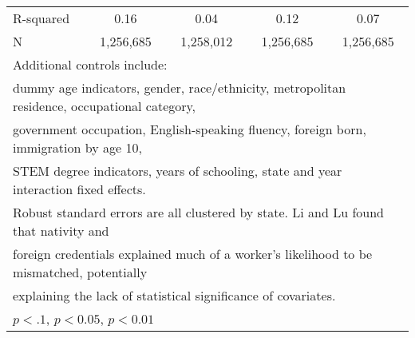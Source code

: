 \begin{table}[htbp]
\begin{tabular}{l*{4}{c}}
R-squared           &        0.16         &        0.04         &        0.12         &        0.07         \\
N                   &   1,256,685         &   1,258,012         &   1,256,685         &   1,256,685         \\
\bottomrule
\multicolumn{5}{l}{\footnotesize Additional controls include:}\\
\multicolumn{5}{l}{\footnotesize dummy age indicators, gender, race/ethnicity, metropolitan residence, occupational category,}\\
\multicolumn{5}{l}{\footnotesize government occupation, English-speaking fluency, foreign born, immigration by age 10,}\\
\multicolumn{5}{l}{\footnotesize STEM degree indicators, years of schooling, state and year interaction fixed effects.}\\
\multicolumn{5}{l}{\footnotesize Robust standard errors are all clustered by state. Li and Lu found that nativity and}\\
\multicolumn{5}{l}{\footnotesize foreign credentials explained much of a worker's likelihood to be mismatched, potentially}\\
\multicolumn{5}{l}{\footnotesize explaining the lack of statistical significance of covariates.}\\
\multicolumn{5}{l}{\footnotesize \sym{*} \(p<.1\), \sym{**} \(p<0.05\), \sym{***} \(p<0.01\)}\\
\end{tabular}
\end{table}
